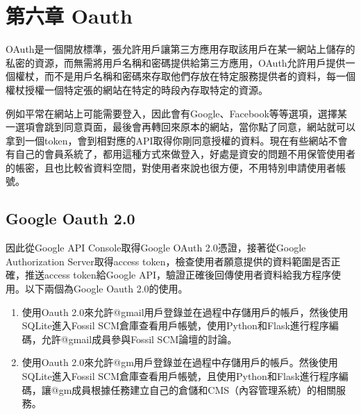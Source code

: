 \chapter{第六章 \quad Oauth}
\renewcommand{\baselinestretch}{10} %
\par
\renewcommand{\baselinestretch}{1} %
\twelve \qquad OAuth是一個開放標準，張允許用戶讓第三方應用存取該用戶在某一網站上儲存的私密的資源，而無需將用戶名稱和密碼提供給第三方應用，OAuth允許用戶提供一個權杖，而不是用戶名稱和密碼來存取他們存放在特定服務提供者的資料，每一個權杖授權一個特定張的網站在特定的時段內存取特定的資源。\\
\par
\twelve \hspace{0.5em} 例如平常在網站上可能需要登入，因此會有Google、Facebook等等選項，選擇某一選項會跳到同意頁面，最後會再轉回來原本的網站，當你點了同意，網站就可以拿到一個token，會到相對應的API取得你剛同意授權的資料。現在有些網站不會有自己的會員系統了，都用這種方式來做登入，好處是資安的問題不用保管使用者的帳密，且也比較省資料空間，對使用者來說也很方便，不用特別申請使用者帳號。

\renewcommand{\baselinestretch}{20} %
\section{Google Oauth 2.0}
\par
\renewcommand{\baselinestretch}{1} %
\twelve \qquad 因此從Google API Console取得Google OAuth 2.0憑證，接著從Google Authorization Server取得access token，檢查使用者願意提供的資料範圍是否正確，推送access token給Google API，驗證正確後回傳使用者資料給我方程序使用。以下兩個為Google Oauth 2.0的使用。
\begin{enumerate}
\item 使用Oauth 2.0來允許@gmail用戶登錄並在過程中存儲用戶的帳戶，然後使用SQLite進入Fossil SCM倉庫查看用戶帳號，使用Python和Flask進行程序編碼，允許@gmail成員參與Fossil SCM論壇的討論。
\item 使用Oauth 2.0來允許@gm用戶登錄並在過程中存儲用戶的帳戶。然後使用SQLite進入Fossil SCM倉庫查看用戶帳號，且使用Python和Flask進行程序編碼，讓@gm成員根據任務建立自己的倉儲和CMS（內容管理系統）的相關服務。
\end{enumerate}
\par